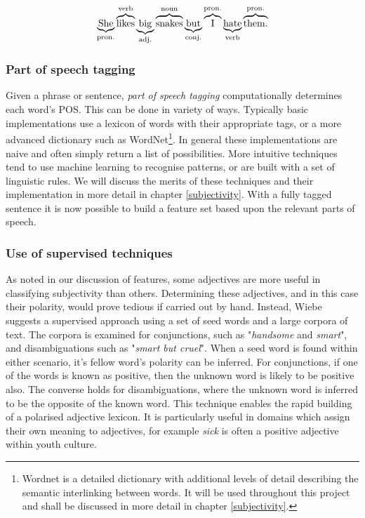 \begin{equation}
	\underbrace{{\rm She}}_{\rm pron.} \overbrace{{\rm likes}}^{\rm verb} \underbrace{{\rm big}}_{\rm adj.} \overbrace{{\rm snakes}}^{\rm noun} \underbrace{{\rm but}}_{\rm conj.} \overbrace{{\rm I}}^{\rm pron.} \underbrace{{\rm hate}}_{\rm verb} \overbrace{{\rm them.}}^{\rm pron.}
\end{equation}

\subsubsection{Part of speech tagging}

Given a phrase or sentence, \emph{part of speech tagging} computationally determines each word's POS. This can be done in variety of ways. Typically basic implementations use a lexicon of words with their appropriate tags, or a more advanced dictionary such as WordNet\footnote{Wordnet is a detailed dictionary with additional levels of detail describing the semantic interlinking between words. It will be used throughout this project and shall be discussed in more detail in chapter \ref{subjectivity}.}. In general these implementations are naive and often simply return a list of possibilities. More intuitive techniques tend to use machine learning to recognise patterns, or are built with a set of linguistic rules. We will discuss the merits of these techniques and their implementation in more detail in chapter \ref{subjectivity}. With a fully tagged sentence it is now possible to build a feature set based upon the relevant parts of speech.

\subsubsection{Use of supervised techniques}

As noted in our discussion of features, some adjectives are more useful in classifying subjectivity than others. Determining these adjectives, and in this case their polarity, would prove tedious if carried out by hand. Instead, Wiebe \cite{Wiebe:2000ub} suggests a supervised approach using a set of seed words and a large corpora of text. The corpora is examined for conjunctions, such as "\emph{handsome} and \emph{smart}", and disambiguations such as "\emph{smart but cruel}". When a seed word is found within either scenario, it's fellow word's polarity can be inferred. For conjunctions, if one of the words is known as positive, then the unknown word is likely to be positive also. The converse holds for disambiguations, where the unknown word is inferred to be the opposite of the known word. This technique enables the rapid building of a polarised adjective lexicon. It is particularly useful in domains which assign their own meaning to adjectives, for example \emph{sick} is often a positive adjective within youth culture.

